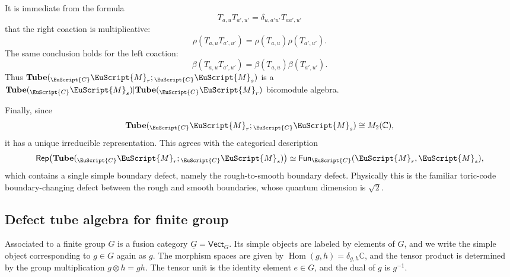 \documentclass[a4paper,11pt]{article}
\theoremstyle{definition}
\theoremstyle{remark}
\newcommand\eC           {\EuScript{C}}
\newcommand\eM          {\EuScript{M}}
\newcommand{\Rep}{\mathsf{Rep}}
\newcommand{\Hom}{\operatorname{Hom}}
\newcommand{\Fun}{\mathsf{Fun}}
\newcommand{\Vect}{\mathsf{Vect}}
\begin{document}
It is immediate from the formula
\begin{equation}
    T_{a,u}T_{a',u'}=\delta_{u,a'u'}T_{aa',u'}
\end{equation}
that the right coaction is multiplicative:
\begin{equation}
    \rho(T_{a,u}T_{a',u'})
    =
    \rho(T_{a,u})\rho(T_{a',u'}).
\end{equation}
The same conclusion holds for the left coaction:
\begin{equation}
    \beta(T_{a,u}T_{a',u'})
    =
    \beta(T_{a,u})\beta(T_{a',u'}).
\end{equation}
Thus $\mathbf{Tube}({}_\eC\eM_r;{}_\eC\eM_s)$ is a
$\mathbf{Tube}({}_\eC\eM_s)|\mathbf{Tube}({}_\eC\eM_r)$ bicomodule algebra.

Finally, since
\begin{equation}
    \mathbf{Tube}({}_\eC\eM_r;{}_\eC\eM_s)\cong M_2(\mathbb C),
\end{equation}
it has a unique irreducible representation. This agrees with the categorical description
\begin{equation}
    \Rep\bigl(\mathbf{Tube}({}_\eC\eM_r;{}_\eC\eM_s)\bigr)
    \simeq
    \Fun_\eC(\eM_r,\eM_s),
\end{equation}
which contains a single simple boundary defect, namely the rough-to-smooth boundary
defect. Physically this is the familiar toric-code boundary-changing defect between the
rough and smooth boundaries, whose quantum dimension is $\sqrt{2}$.






\subsection{Defect tube algebra for finite group}
 
Associated to a finite group $G$ is a fusion category $\underline{G}=\Vect_G$. Its simple objects are labeled by elements of $G$, and we write the simple object corresponding to $g\in G$ again as $g$. The morphism spaces are given by $\Hom(g,h) = \delta_{g,h}\mathbb{C}$, and the tensor product is determined by the group multiplication $g\otimes h=gh$. The tensor unit is the identity element $e\in G$, and the dual of $g$ is $g^{-1}$. 
\end{document}
